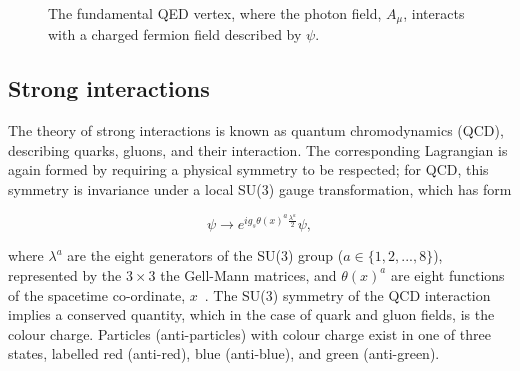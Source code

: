 \begin{figure}[htb]
  \centering
  \caption[The fundamental QED interaction vertex.]{The fundamental QED vertex, where the photon field, ${A_{\mu}}$, interacts with a charged fermion field described by ${\psi}$.}
  \label{fig:theory_qed_vertex}
\end{figure}


\subsection{Strong interactions}

The theory of strong interactions is known as quantum chromodynamics (QCD), describing quarks, gluons, and their interaction. The corresponding Lagrangian is again formed by requiring a physical symmetry to be respected; for QCD, this symmetry is invariance under a local SU(3) gauge transformation, which has form

\begin{equation}
    \psi \rightarrow e^{ig_{s}\theta(x)^{a}\frac{\lambda^{a}}{2}}\psi,
\end{equation} %

\noindent where ${\lambda^{a}}$ are the eight generators of the SU(3) group (${a\in\{1,2,...,8\}}$), represented by the ${3\times3}$ the Gell-Mann matrices, and ${\theta(x)^{a}}$ are eight functions of the spacetime co-ordinate, ${x}$~\cite{Thomson}. The SU(3) symmetry of the QCD interaction implies a conserved quantity, which in the case of quark and gluon fields, is the colour charge. Particles (anti-particles) with colour charge exist in one of three states, labelled red (anti-red), blue (anti-blue), and green (anti-green). %

